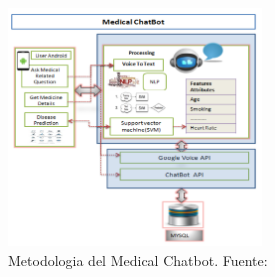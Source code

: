 	\begin{figure}[H]
		\begin{center}
			\includegraphics[width=0.6\textwidth]{2/1_antecedentes/Metodologia-10.png}
			\caption{Metodologia del Medical Chatbot. Fuente: \cite{MedicalChatBot}}
		\end{center}
	\end{figure}
\vspace{-10mm}
